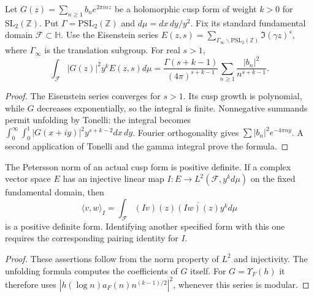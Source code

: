 \begin{theorem}
\label{v4-arith:w5-a:thm:RS-integral}
Let $G(z)=\sum_{n\ge1}b_n e^{2\pi inz}$ be a holomorphic cusp form
of weight $k>0$ for $\mathrm{SL}_2(\mathbb Z)$.
Put $\Gamma=\mathrm{PSL}_2(\mathbb Z)$ and $d\mu=dx\,dy/y^2$.
Fix its standard fundamental domain $\mathcal F\subset\mathbb H$.
Use the Eisenstein series
$E(z,s)=\sum_{\Gamma_\infty\backslash\mathrm{PSL}_2(\mathbb Z)}
\Im(\gamma z)^s$, where $\Gamma_\infty$ is the translation subgroup.
For real $s>1$,
\begin{equation}
 \int_{\mathcal F}|G(z)|^2y^kE(z,s)d\mu
 =\frac{\Gamma(s+k-1)}{(4\pi)^{s+k-1}}
       \sum_{n\ge1}\frac{|b_n|^2}{n^{s+k-1}}.
 \label{v4-arith:w5-a:eq:KF-kernel}
\end{equation}
\end{theorem}
\begin{proof}
The Eisenstein series converges for $s>1$. Its cusp growth is
polynomial, while $G$ decreases exponentially, so the integral is
finite. Nonnegative summands permit unfolding by Tonelli:
the integral becomes
$\int_0^\infty\int_0^1|G(x+iy)|^2y^{s+k-2}dx\,dy$.
Fourier orthogonality gives $\sum|b_n|^2e^{-4\pi ny}$.
A second application of Tonelli and the gamma integral prove the formula.
\end{proof}

\begin{proposition}
\label{v4-arith:w5-a:thm:petersson-positive}
The Petersson norm of an actual cusp form is positive definite.
If a complex vector space $E$ has an injective linear map
$I:E\to L^2(\mathcal F,y^k d\mu)$ on the fixed fundamental domain, then
\begin{equation}
 \langle v,w\rangle_I=\int_{\mathcal F}(Iv)(z)\overline{(Iw)(z)}y^k d\mu
 \label{v4-arith:w5-a:eq:petersson}
\end{equation}
is a positive definite form. Identifying another specified form
with this one requires the corresponding pairing identity for $I$.
\end{proposition}
\begin{proof}
These assertions follow from the norm property of $L^2$ and
injectivity. The unfolding formula computes the coefficients
of $G$ itself. For $G=\Upsilon_F(h)$ it therefore uses
$|h(\log n)a_F(n)n^{(k-1)/2}|^2$, whenever this series is modular.
\end{proof}

